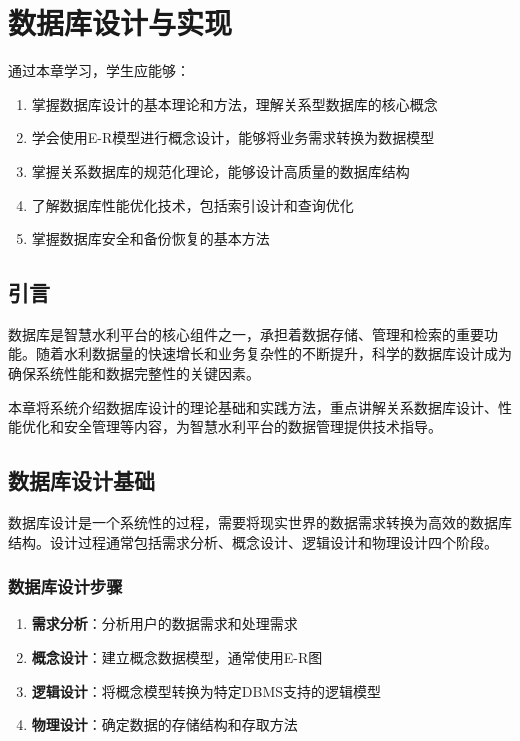 \chapter{数据库设计与实现}

\begin{learningobjectives}
通过本章学习，学生应能够：
\begin{enumerate}
    \item 掌握数据库设计的基本理论和方法，理解关系型数据库的核心概念
    \item 学会使用E-R模型进行概念设计，能够将业务需求转换为数据模型
    \item 掌握关系数据库的规范化理论，能够设计高质量的数据库结构
    \item 了解数据库性能优化技术，包括索引设计和查询优化
    \item 掌握数据库安全和备份恢复的基本方法
\end{enumerate}
\end{learningobjectives}

\section{引言}

数据库是智慧水利平台的核心组件之一，承担着数据存储、管理和检索的重要功能。随着水利数据量的快速增长和业务复杂性的不断提升，科学的数据库设计成为确保系统性能和数据完整性的关键因素。

本章将系统介绍数据库设计的理论基础和实践方法，重点讲解关系数据库设计、性能优化和安全管理等内容，为智慧水利平台的数据管理提供技术指导。

\section{数据库设计基础}

数据库设计是一个系统性的过程，需要将现实世界的数据需求转换为高效的数据库结构。设计过程通常包括需求分析、概念设计、逻辑设计和物理设计四个阶段。

\subsection{数据库设计步骤}

\begin{enumerate}
    \item \textbf{需求分析}：分析用户的数据需求和处理需求
    \item \textbf{概念设计}：建立概念数据模型，通常使用E-R图
    \item \textbf{逻辑设计}：将概念模型转换为特定DBMS支持的逻辑模型
    \item \textbf{物理设计}：确定数据的存储结构和存取方法
\end{enumerate}

